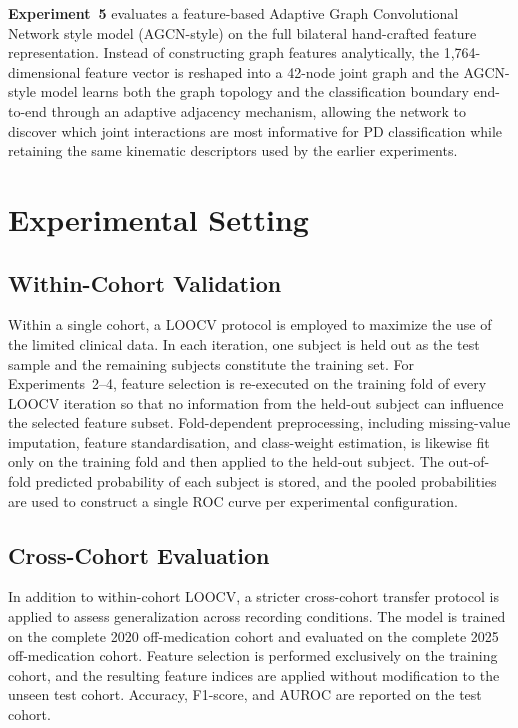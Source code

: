 \textbf{Experiment~5} evaluates a feature-based Adaptive Graph Convolutional Network style model (AGCN-style) on the full bilateral hand-crafted feature representation. Instead of constructing graph features analytically, the 1,764-dimensional feature vector is reshaped into a 42-node joint graph and the AGCN-style model learns both the graph topology and the classification boundary end-to-end through an adaptive adjacency mechanism, allowing the network to discover which joint interactions are most informative for PD classification while retaining the same kinematic descriptors used by the earlier experiments.

\section{Experimental Setting}
\label{sec:exp_setting}

\subsection{Within-Cohort Validation}
\label{sec:loocv}

Within a single cohort, a LOOCV protocol is employed to maximize the use of the limited clinical data. In each iteration, one subject is held out as the test sample and the remaining subjects constitute the training set. For Experiments~2--4, feature selection is re-executed on the training fold of every LOOCV iteration so that no information from the held-out subject can influence the selected feature subset. Fold-dependent preprocessing, including missing-value imputation, feature standardisation, and class-weight estimation, is likewise fit only on the training fold and then applied to the held-out subject. The out-of-fold predicted probability of each subject is stored, and the pooled probabilities are used to construct a single ROC curve per experimental configuration.

\subsection{Cross-Cohort Evaluation}
\label{sec:cross_cohort}

In addition to within-cohort LOOCV, a stricter cross-cohort transfer protocol is applied to assess generalization across recording conditions. The model is trained on the complete 2020 off-medication cohort and evaluated on the complete 2025 off-medication cohort. Feature selection is performed exclusively on the training cohort, and the resulting feature indices are applied without modification to the unseen test cohort. Accuracy, F1-score, and AUROC are reported on the test cohort.

